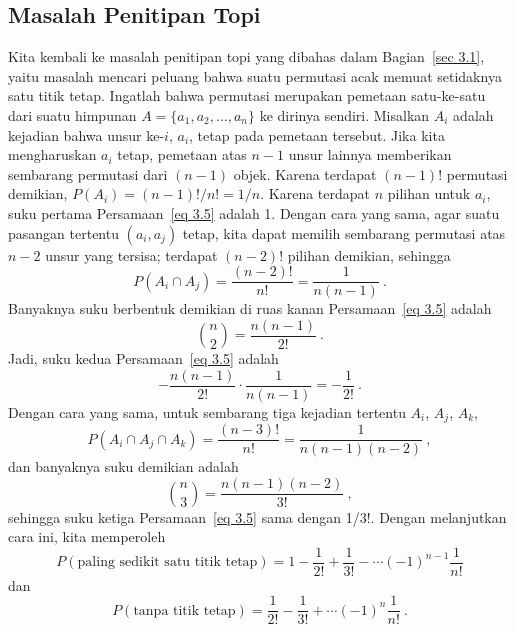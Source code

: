 \subsection*{Masalah Penitipan Topi}

\begin{example}\label{exam 3.13}  Kita kembali ke masalah penitipan topi
 yang dibahas dalam Bagian~\ref{sec 3.1}, yaitu masalah
mencari peluang bahwa suatu permutasi acak memuat setidaknya satu titik tetap.  Ingatlah
bahwa permutasi merupakan pemetaan satu-ke-satu dari suatu himpunan
$A = \{a_1,a_2,\dots,a_n\}$ ke dirinya sendiri.  Misalkan $A_i$ adalah kejadian bahwa
unsur ke-$i$, $a_i$, tetap pada pemetaan tersebut.  Jika kita mengharuskan $a_i$ tetap,
pemetaan atas $n - 1$ unsur lainnya memberikan sembarang permutasi dari $(n -
1)$ objek.  Karena terdapat $(n - 1)!$ permutasi demikian,
$P(A_i) = (n - 1)!/n! =
1/n$.  Karena terdapat $n$ pilihan untuk $a_i$, suku pertama
Persamaan~\ref{eq 3.5} adalah 1.  Dengan cara yang sama, agar suatu pasangan tertentu
$(a_i,a_j)$ tetap, kita dapat memilih sembarang permutasi atas $n - 2$ unsur yang
tersisa; terdapat $(n - 2)!$ pilihan demikian, sehingga
$$ P(A_i \cap A_j) = \frac{(n - 2)!}{n!} = \frac 1{n(n - 1)}\ .
$$ Banyaknya suku berbentuk demikian di ruas kanan Persamaan~\ref{eq 3.5} adalah $$ {n
\choose 2} = \frac{n(n - 1)}{2!}\ .
$$ Jadi, suku kedua Persamaan~\ref{eq 3.5} adalah
$$ -\frac{n(n - 1)}{2!} \cdot \frac 1{n(n - 1)} = -\frac 1{2!}\ .
$$ Dengan cara yang sama, untuk sembarang tiga kejadian tertentu $A_i$, $A_j$, $A_k$,
$$ P(A_i \cap A_j \cap A_k) = \frac{(n - 3)!}{n!} = \frac 1{n(n - 1)(n - 2)}\ ,
$$ dan banyaknya suku demikian adalah
$$ {n \choose 3} = \frac{n(n - 1)(n - 2)}{3!}\ ,
$$ sehingga suku ketiga Persamaan~\ref{eq 3.5} sama dengan 1/3!.  Dengan melanjutkan
cara ini, kita memperoleh
$$ P(\mbox {paling\ sedikit\ satu\ titik\ tetap}) = 1 - \frac 1{2!} + \frac 1{3!} - \cdots
(-1)^{n-1} \frac 1{n!}
$$ dan
$$ P(\mbox {tanpa\ titik\ tetap}) = \frac 1{2!} - \frac 1{3!} + \cdots (-1)^n \frac 1{n!}\ .
$$


\end{example}
